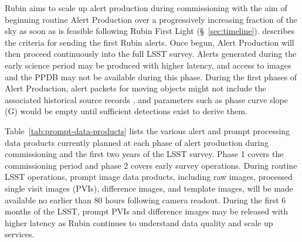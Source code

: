 Rubin aims to scale up alert production during commissioning with the aim of beginning routine Alert Production over a progressively increasing fraction of the sky as soon as is feasible following Rubin First Light  (\S~\ref{sec:timeline}).
 describes the criteria for sending the first Rubin alerts.
Once begun, Alert Production will then proceed continuously into the full LSST survey.
Alerts generated during the early science period may be produced with higher latency, and access to images and the PPDB may not be available during this phase.
During the first phases of Alert Production, alert packets for moving objects might not include the associated historical source records , and parameters such as phase curve slope (G) would be empty until sufficient detections exist to derive them.

Table~\ref{tab:prompt-data-products} lists the various alert and prompt processing data products currently planned at each phase of alert production during commissioning and the first two years of the LSST survey. 
Phase 1 covers the commissioning period and phase 2 covers early survey operations.  
During routine LSST operations, prompt image data products, including  raw images, processed single visit images (PVIs), difference images, and template images, will be made available no earlier than 80 hours following camera readout. 
During the first 6 months of the LSST,  prompt PVIs and difference images may be released with higher latency as Rubin continues to understand data quality and scale up services.




